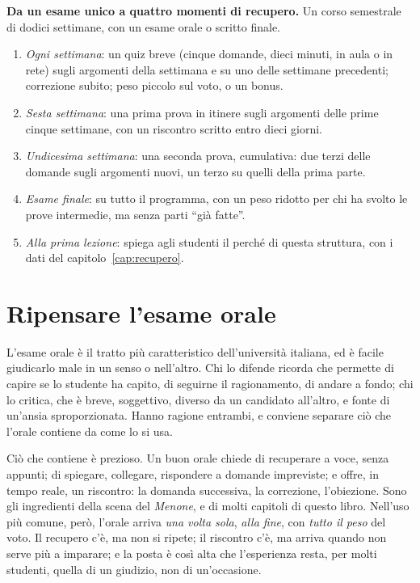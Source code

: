 \begin{inpratica}
\textbf{Da un esame unico a quattro momenti di recupero.} Un corso
semestrale di dodici settimane, con un esame orale o scritto finale.
\begin{enumerate}
  \item \emph{Ogni settimana}: un quiz breve (cinque domande, dieci
        minuti, in aula o in rete) sugli argomenti della settimana e
        su uno delle settimane precedenti; correzione subito; peso
        piccolo sul voto, o un bonus.
  \item \emph{Sesta settimana}: una prima prova in itinere sugli
        argomenti delle prime cinque settimane, con un riscontro
        scritto entro dieci giorni.
  \item \emph{Undicesima settimana}: una seconda prova, cumulativa:
        due terzi delle domande sugli argomenti nuovi, un terzo su
        quelli della prima parte.
  \item \emph{Esame finale}: su tutto il programma, con un peso
        ridotto per chi ha svolto le prove intermedie, ma senza parti
        \enquote{già fatte}.
  \item \emph{Alla prima lezione}: spiega agli studenti il perché di
        questa struttura, con i dati del capitolo~\ref{cap:recupero}.
\end{enumerate}
\end{inpratica}

\section{Ripensare l'esame orale}

L'esame orale è il tratto più caratteristico dell'università
italiana, ed è facile giudicarlo male in un senso o nell'altro. Chi lo
difende ricorda che permette di capire se lo studente ha capito, di
seguirne il ragionamento, di andare a fondo; chi lo critica, che è
breve, soggettivo, diverso da un candidato all'altro, e fonte di
un'ansia sproporzionata. Hanno ragione entrambi, e conviene separare
ciò che l'orale contiene da come lo si usa.

Ciò che contiene è prezioso. Un buon orale chiede di recuperare a
voce, senza appunti; di spiegare, collegare, rispondere a domande
impreviste; e offre, in tempo reale, un riscontro: la domanda
successiva, la correzione, l'obiezione. Sono gli ingredienti della
scena del \emph{Menone}, e di molti capitoli di questo libro.
Nell'uso più comune, però, l'orale arriva \emph{una volta sola},
\emph{alla fine}, con \emph{tutto il peso} del voto. Il recupero c'è,
ma non si ripete; il riscontro c'è, ma arriva quando non serve più a
imparare; e la posta è così alta che l'esperienza resta, per molti
studenti, quella di un giudizio, non di un'occasione.

